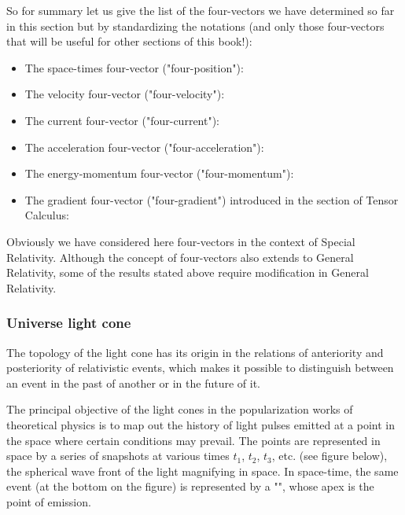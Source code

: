 	So for summary let us give the list of the four-vectors we have determined so far in this section but by standardizing the notations (and only those four-vectors that will be useful for other sections of this book!):
	\begin{itemize}
		\item The space-times four-vector ("four-position"):
		

		\item The velocity four-vector ("four-velocity"):
		
		
		\item The current four-vector ("four-current"):
		
		
		\item The acceleration four-vector ("four-acceleration"):
		
		
		\item The energy-momentum four-vector ("four-momentum"):
		

		\item The gradient four-vector ("four-gradient") introduced in the section of Tensor Calculus:
		
	\end{itemize}
	Obviously we have considered here four-vectors in the context of Special Relativity. Although the concept of four-vectors also extends to General Relativity, some of the results stated above require modification in General Relativity.
	
	\subsubsection{Universe light cone}
	The topology of the light cone has its origin in the relations of anteriority and posteriority of relativistic events, which makes it possible to distinguish between an event in the past of another or in the future of it.

	The principal objective of the light cones in the popularization works of theoretical physics is to map out the history of light pulses emitted at a point in the space where certain conditions may prevail. The points are represented in space by a series of snapshots at various times $t_1$, $t_2$, $t_3$, etc. (see figure below), the spherical wave front of the light magnifying in space. In space-time, the same event (at the bottom on the figure) is represented by a "", whose apex is the point of emission.

